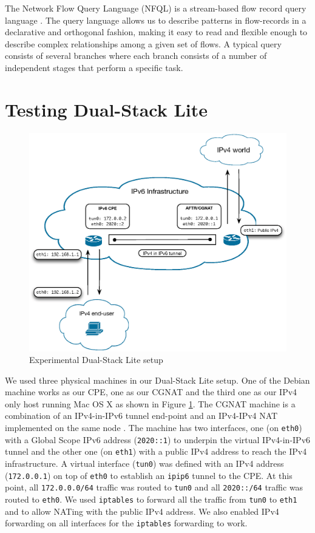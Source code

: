 \documentclass{llncs}
\begin{document}
The Network Flow Query Language (NFQL) \cite{jschauer:thesis:2011, AIMS2010} is a stream-based flow record query language \cite{MARINOV}. The query language allows us to describe patterns in flow-records in a declarative and orthogonal fashion, making it easy to read and flexible enough to describe complex relationships among a given set of flows. A typical query consists of several branches where each branch consists of a number of independent stages that perform a specific task.

\section{Testing Dual-Stack Lite}
\label{sec:app-ds-lite}

\begin{figure}[ht!]
  \centering
  \includegraphics[scale=0.55]{dslite-setup}	
  \caption{Experimental Dual-Stack Lite setup}
  \label{fig:DSLiteSetup}
\end{figure}
We used three physical machines in our Dual-Stack Lite setup. One of the Debian machine works as our CPE, one as our CGNAT and the third one as our IPv4 only host running Mac OS X as shown in Figure \ref{fig:DSLiteSetup}. The CGNAT machine is a combination of an IPv4-in-IPv6 tunnel end-point and an IPv4-IPv4 NAT implemented on the same node \cite{DSLITE}. The machine has two interfaces, one (on \texttt{eth0}) with a Global Scope IPv6 address (\texttt{2020::1}) to underpin the virtual IPv4-in-IPv6 tunnel and the other one (on \texttt{eth1}) with a public IPv4 address to reach the IPv4 infrastructure. A virtual interface (\texttt{tun0}) was defined with an IPv4 address (\texttt{172.0.0.1}) on top of \texttt{eth0} to establish an \texttt{ipip6} tunnel to the CPE. At this point, all \texttt{172.0.0.0/64} traffic was routed to \texttt{tun0} and all \texttt{2020::/64} traffic was routed to \texttt{eth0}. We used \texttt{iptables} to forward all the traffic from \texttt{tun0} to \texttt{eth1} and to allow NATing with the public IPv4 address. We also enabled IPv4 forwarding on all interfaces for the \texttt{iptables} forwarding to work. 
\end{document}
